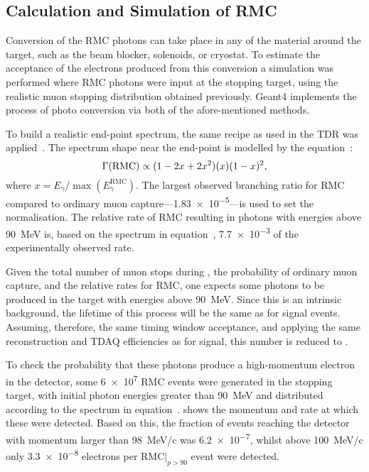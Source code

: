 \subsection{Calculation and Simulation of RMC}
Conversion of the RMC photons can take place in any of the material around the target, such as the beam blocker, solenoids, or cryostat.
To estimate the acceptance of the electrons produced from this conversion a simulation was performed where RMC photons were input at the stopping target, using the realistic muon stopping distribution obtained previously.
Geant4 implements the process of photo conversion via both of the afore-mentioned methods.

To build a realistic end-point spectrum, the same recipe as used in the \phaseI TDR was applied~\cite{TDR2016}.
The spectrum shape near the end-point is modelled by the equation~\cite{CHRISTILLIN1980331}:
\begin{equation}
	\eqlabel{bg:rmc:spect}
	\Gamma(\textrm{RMC})\propto(1-2x+2x^2)(x)(1-x)^2,
\end{equation}
where $x=E_\gamma/\max(E_\gamma^\textrm{RMC})$.
The largest observed branching ratio for \ac{RMC} compared to ordinary muon capture---\num{1.83e-5}---is used to set the normalisation.
The relative rate of \ac{RMC} resulting in photons with energies above 90~MeV is, based on the spectrum in equation~, \num{7.7e-3} of the experimentally observed rate.
\FigRMCSimResults

Given the total number of muon stops during \phaseII, the probability of ordinary muon capture, and the relative rates for \ac{RMC}, one expects some \VarRMCTotalPhotonPhaseII  photons to be produced in the target with energies above 90~MeV.
Since this is an intrinsic background, the lifetime of this process will be the same as for signal events. 
Assuming, therefore, the same timing window acceptance, and applying the same reconstruction and TDAQ efficiencies as for signal, this number is reduced to \VarRMCTotalPhotonPhaseIIAccepted.

To check the probability that these photons produce a high-momentum electron in the detector, 
some \num{6e7} RMC events were generated in the stopping target, with initial photon energies greater than 90~MeV and distributed according to the spectrum in equation~.
 shows the momentum and rate at which these were detected.
Based on this, the fraction of events reaching the detector with momentum larger than 98~MeV/c was \num{6.2e-7}, whilst above 100~MeV/c only \num{3.3e-8} electrons per \ac{RMC}$|_{p>90}$ event were detected.

